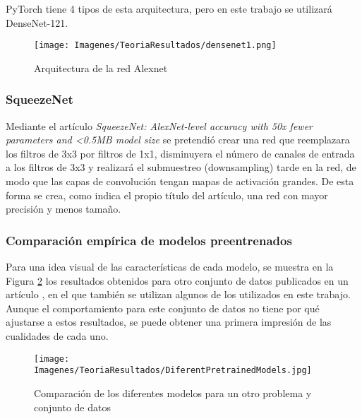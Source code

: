 \documentclass{report}
\begin{document}
PyTorch tiene 4 tipos de esta arquitectura, pero en este trabajo se utilizará DenseNet-121.


\vspace{1.2cm}
\begin{figure}[H]
    \centering
    \texttt{[image: Imagenes/TeoriaResultados/densenet1.png]}
    \caption{Arquitectura de la red Alexnet \cite{DenseNetPaper}}
    \label{fig:Densenet}
\end{figure}
\vspace{0.4cm}

\newpage
\subsubsection{SqueezeNet}

Mediante el artículo \textit{SqueezeNet: AlexNet-level accuracy with 50x fewer parameters and <0.5MB model size} \cite{SqueezeNetPaper} se pretendió crear una red que reemplazara los filtros de 3x3 por filtros de 1x1, disminuyera el número de canales de entrada a los filtros de 3x3 y  realizará el submuestreo (downsampling) tarde en la red, de modo que las capas de convolución tengan mapas de activación grandes. De esta forma se crea, como indica el propio título del artículo, una red con mayor precisión y menos tamaño.


\subsubsection{Comparación empírica de modelos preentrenados}

Para una idea visual de las características de cada modelo, se muestra en la Figura \ref{fig:ComparingPretrained} los resultados obtenidos para otro conjunto de datos publicados en un artículo \cite{PaperComparesModelsPapers}, en el que también se utilizan algunos de los utilizados en este trabajo. Aunque el comportamiento para este conjunto de datos no tiene por qué ajustarse a estos resultados, se puede obtener una primera impresión de las cualidades de cada uno.

\hspace{0.4cm}
\begin{figure}[hbpt]
	\centering
	 \texttt{[image: Imagenes/TeoriaResultados/DiferentPretrainedModels.jpg]}
	 \caption{ Comparación de los diferentes modelos para un otro problema y conjunto de datos \cite{PaperComparesModelsPapers}}
	 \label{fig:ComparingPretrained}
\end{figure}
\end{document}
